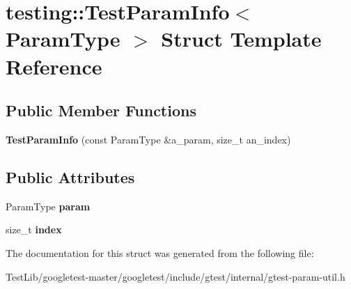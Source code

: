 \hypertarget{structtesting_1_1TestParamInfo}{}\section{testing\+:\+:Test\+Param\+Info$<$ Param\+Type $>$ Struct Template Reference}
\label{structtesting_1_1TestParamInfo}
\subsection*{Public Member Functions}
\begin{DoxyCompactItemize}
\item 
\mbox{\label{structtesting_1_1TestParamInfo_aa54199319bcad5a33c8538ecaecb6de5}} 
{\bfseries Test\+Param\+Info} (const Param\+Type \&a\+\_\+param, size\+\_\+t an\+\_\+index)
\end{DoxyCompactItemize}
\subsection*{Public Attributes}
\begin{DoxyCompactItemize}
\item 
\mbox{\label{structtesting_1_1TestParamInfo_a146d921039f9da8b1336f7cc6e8436c2}} 
Param\+Type {\bfseries param}
\item 
\mbox{\label{structtesting_1_1TestParamInfo_ad4d7bc02cbcc571eb3c1d2ec3ba5bb53}} 
size\+\_\+t {\bfseries index}
\end{DoxyCompactItemize}


The documentation for this struct was generated from the following file\+:\begin{DoxyCompactItemize}
\item 
Test\+Lib/googletest-\/master/googletest/include/gtest/internal/gtest-\/param-\/util.\+h\end{DoxyCompactItemize}
